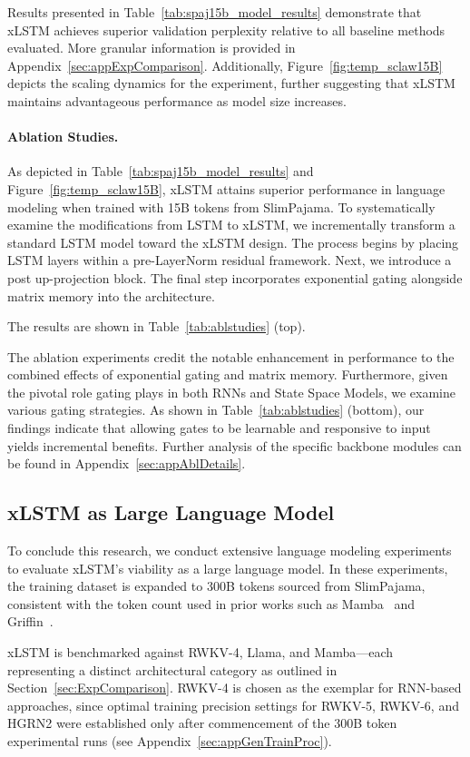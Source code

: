Results presented in Table~\ref{tab:spaj15b_model_results} demonstrate that xLSTM achieves superior validation perplexity relative to all baseline methods evaluated. More granular information is provided in Appendix~\ref{sec:appExpComparison}. Additionally, Figure~\ref{fig:temp_sclaw15B} depicts the scaling dynamics for the experiment, further suggesting that xLSTM maintains advantageous performance as model size increases.

\paragraph{Ablation Studies.}
As depicted in Table~\ref{tab:spaj15b_model_results} and Figure~\ref{fig:temp_sclaw15B}, xLSTM attains superior performance in language modeling when trained with 15B tokens from SlimPajama. To systematically examine the modifications from LSTM to xLSTM, we incrementally transform a standard LSTM model toward the xLSTM design. The process begins by placing LSTM layers within a pre-LayerNorm residual framework. Next, we introduce a post up-projection block. The final step incorporates exponential gating alongside matrix memory into the architecture.

The results are shown in Table~\ref{tab:ablstudies} (top). 

The ablation experiments credit the notable enhancement in performance to the combined effects of exponential gating and matrix memory. Furthermore, given the pivotal role gating plays in both RNNs and State Space Models, we examine various gating strategies. As shown in Table~\ref{tab:ablstudies} (bottom), our findings indicate that allowing gates to be learnable and responsive to input yields incremental benefits. Further analysis of the specific backbone modules can be found in Appendix~\ref{sec:appAblDetails}.

\subsection{xLSTM as Large Language Model}
\label{sec:ExpLanguage}

To conclude this research, we conduct extensive language modeling experiments to evaluate xLSTM’s viability as a large language model. In these experiments, the training dataset is expanded to 300B tokens sourced from SlimPajama, consistent with the token count used in prior works such as Mamba~\citep{Gu:24arxiv} and Griffin~\citep{De:24arxiv}.

xLSTM is benchmarked against RWKV-4, Llama, and Mamba—each representing a distinct architectural category as outlined in Section~\ref{sec:ExpComparison}. RWKV-4 is chosen as the exemplar for RNN-based approaches, since optimal training precision settings for RWKV-5, RWKV-6, and HGRN2 were established only after commencement of the 300B token experimental runs (see Appendix~\ref{sec:appGenTrainProc}).

